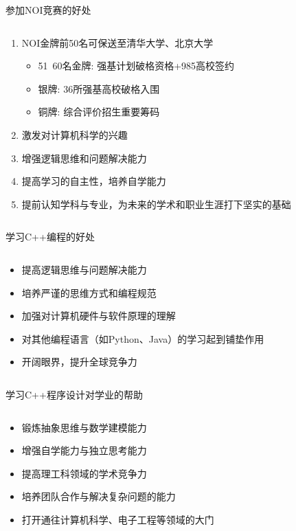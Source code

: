 \documentclass{beamer}
\begin{document}
\begin{frame}[t]{参加NOI竞赛的好处}
\begin{columns}
\begin{spacing}{1.2}
\large
    \begin{enumerate}[label={\arabic*.}]
	\item NOI金牌前50名可保送至清华大学、北京大学
	\begin{itemize}
		\item 51~60名金牌: 强基计划破格资格+985高校签约
        \item 银牌: 36所强基高校破格入围
        \item 铜牌: 综合评价招生重要筹码
    \end{itemize}
    \item 激发对计算机科学的兴趣
    \item 增强逻辑思维和问题解决能力
    \item 提高学习的自主性，培养自学能力
    \item 提前认知学科与专业，为未来的学术和职业生涯打下坚实的基础
    \end{enumerate}
\end{spacing} 
\end{columns}
\end{frame}

\begin{frame}{学习C++编程的好处}
\begin{columns}
\begin{spacing}{1.2}
\large
    \begin{itemize}
        \item 提高逻辑思维与问题解决能力
        \item 培养严谨的思维方式和编程规范
        \item 加强对计算机硬件与软件原理的理解
        \item 对其他编程语言（如Python、Java）的学习起到铺垫作用
        \item 开阔眼界，提升全球竞争力
    \end{itemize}
\end{spacing} 
\end{columns}
\end{frame}

\begin{frame}{学习C++程序设计对学业的帮助}
\begin{columns}
\begin{spacing}{1.2}
\large
    \begin{itemize}
        \item 锻炼抽象思维与数学建模能力
        \item 增强自学能力与独立思考能力
        \item 提高理工科领域的学术竞争力
        \item 培养团队合作与解决复杂问题的能力
        \item 打开通往计算机科学、电子工程等领域的大门
    \end{itemize}
\end{spacing} 
\end{columns}
\end{frame}
\end{document}
